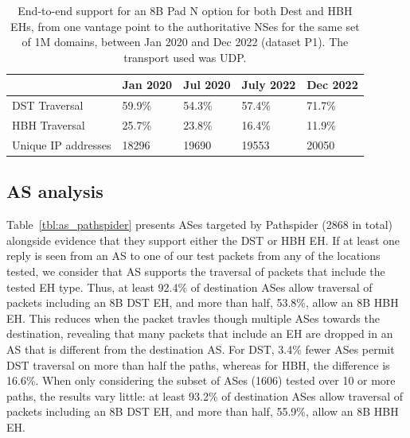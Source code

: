 \documentclass[conference]{IEEEtran}
\begin{document}
\begin{table}
\begin{tabular}{l|l|l|l|l}
                    & Jan 2020 & Jul 2020 & July 2022 & Dec 2022 \\
\hline
DST Traversal& 59.9\%   & 54.3\%   & 57.4\%    & 71.7\%   \\
HBH Traversal & 25.7\%   & 23.8\%   & 16.4\%    & 11.9\%   \\
\hline
Unique IP addresses & 18296    & 19690    & 19553     & 20050   
\end{tabular}
\label{tbl:longitudinal_support}
\caption{End-to-end support for an 8B Pad N option for both Dest and HBH EHs, from one vantage point to the authoritative NSes for the same set of 1M domains, between Jan 2020 and Dec 2022 (dataset P1). The transport used was UDP.}
\end{table}

\subsection{AS analysis}



Table~\ref{tbl:as_pathspider} presents ASes targeted by Pathspider (2868 in total) alongside evidence that they support either the DST or HBH EH.
If at least one reply is seen from an AS to one of our test packets from any of the locations tested, we consider that AS supports the traversal of packets that include the tested EH type. Thus, at least 92.4\% of destination ASes allow traversal of packets including an 8B DST EH, and more than half, 53.8\%, allow an 8B HBH EH. This  reduces when the packet travles though multiple ASes towards the destination, revealing that many packets that include an EH are dropped in an AS that is different from the destination AS. For DST, 3.4\% fewer ASes permit DST traversal on more than half the paths, whereas for HBH, the difference is 16.6\%.
When only considering the subset of ASes (1606) tested over 10 or more paths, the results vary little: at least 93.2\% of destination ASes allow traversal of packets including an 8B DST EH, and more than half, 55.9\%, allow an 8B HBH EH.
\end{document}
